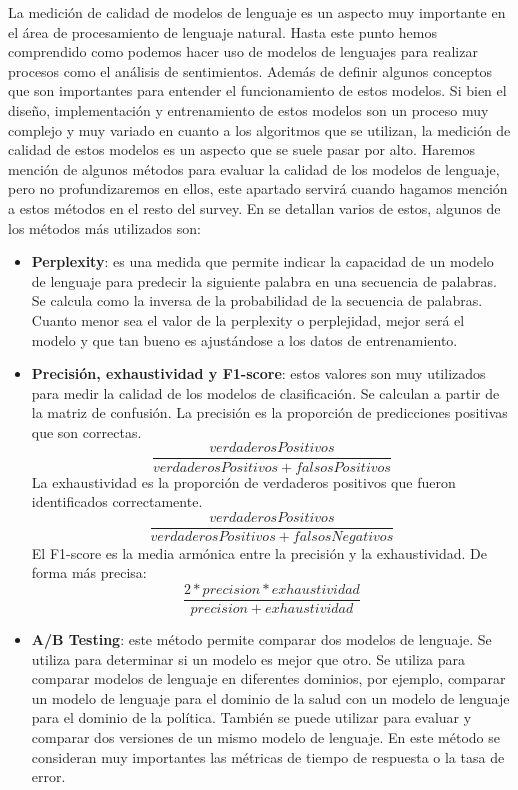 \documentclass[12pt, conference]{IEEEtran}
\begin{document}
La medición de calidad de modelos de lenguaje es un aspecto muy importante en el área de procesamiento de lenguaje natural. Hasta este punto hemos comprendido como podemos hacer uso de modelos de lenguajes para realizar procesos como el análisis de sentimientos. Además de definir algunos conceptos que son importantes para entender el funcionamiento de estos modelos. Si bien el diseño, implementación y entrenamiento de estos modelos son un proceso muy complejo y muy variado en cuanto a los algoritmos que se utilizan, la medición de calidad de estos modelos es un aspecto que se suele pasar por alto.
Haremos mención de algunos métodos para evaluar la calidad de los modelos de lenguaje, pero no profundizaremos en ellos, este apartado servirá cuando hagamos mención a estos métodos en el resto del survey. En \cite{b22, b23, b24, b25, b26} se detallan varios de estos, algunos de los métodos más utilizados son:
\begin{itemize}
  \item \textbf{Perplexity}: es una medida que permite indicar la capacidad de un modelo de lenguaje para predecir la siguiente palabra en una secuencia de palabras. Se calcula como la inversa de la probabilidad de la secuencia de palabras. Cuanto menor sea el valor de la perplexity o perplejidad, mejor será el modelo y que tan bueno es ajustándose a los datos de entrenamiento.
  \item \textbf{Precisión, exhaustividad y F1-score}: estos valores son muy utilizados para medir la calidad de los modelos de clasificación. Se calculan a partir de la matriz de confusión. La precisión es la proporción de predicciones positivas que son correctas.
  \[\frac{verdaderosPositivos}{verdaderosPositivos + falsosPositivos}\]
  La exhaustividad es la proporción de verdaderos positivos que fueron identificados correctamente.
  \[\frac{verdaderosPositivos}{verdaderosPositivos + falsosNegativos}\]
  El F1-score es la media armónica entre la precisión y la exhaustividad. De forma más precisa:
  \[\frac{2 * precision * exhaustividad}{precision + exhaustividad}\]
  \item \textbf{A/B Testing}: este método permite comparar dos modelos de lenguaje. Se utiliza para determinar si un modelo es mejor que otro. Se utiliza para comparar modelos de lenguaje en diferentes dominios, por ejemplo, comparar un modelo de lenguaje para el dominio de la salud con un modelo de lenguaje para el dominio de la política. También se puede utilizar para evaluar y comparar dos versiones de un mismo modelo de lenguaje. En este método se consideran muy importantes las métricas de tiempo de respuesta o la tasa de error.
\end{itemize}
\end{document}
